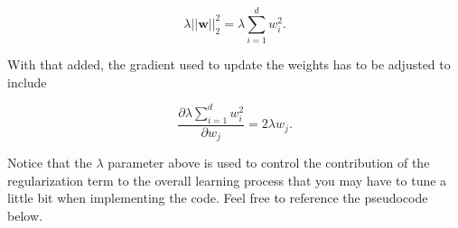 \documentclass{article}
\begin{document}
\begin{equation}
    \lambda||\mathbf{w}||_2^2 = \lambda\sum_{i=1}^{d}w_i^2.
    \label{eq:l2norm}
\end{equation}

\noindent With that added, the gradient used to update the weights has to be adjusted to include 

\begin{equation}
    \frac{\partial \lambda\sum_{i=1}^{d}w_i^2}{\partial w_j} = 2\lambda w_j.
    \label{eq:l2normgrad}
\end{equation}

\noindent Notice that the \(\lambda\) parameter above is used to control the contribution of the regularization term to the overall learning process that you may have to tune a little bit when implementing the code. Feel free to reference the pseudocode below.
\end{document}
